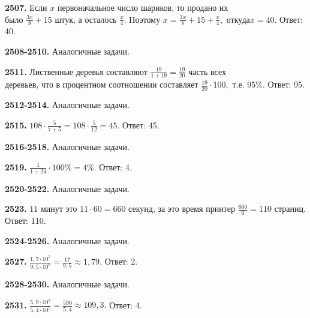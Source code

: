 \textbf{2507.} $\text{Если } x \text{ первоначальное число шариков, то продано их}$\newline$\text{было }\frac{3x}{8} + 15 \text{ штук, а осталось }\frac{x}{4}.\text{ Поэтому } x = \frac{3x}{8} + 15 + \frac{x}{4}, \text{ откуда}$\newline$ x = 40.$ \newline \null \hspace*{\fill} Ответ: 40.  

\textbf{2508-2510.} Аналогичные задачи.

\textbf{2511.} $\text{Лиственные деревья составляют } \frac{19}{1+19} = \frac{19}{20} \text{ часть всех}$\newline$\text{деревьев, что в процентном соотношении составляет } \frac{19}{20} \cdot 100, \text{ т.е. }$\newline$ 95\%$. \newline \null \hspace*{\fill} Ответ: 95. 

\textbf{2512-2514.} Аналогичные задачи.

\textbf{2515.} $108 \cdot \frac{5}{7+5} = 108 \cdot \frac{5}{12} = 45.$ \newline \null \hspace*{\fill} Ответ: 45. 

\textbf{2516-2518.} Аналогичные задачи.

\textbf{2519.} $\frac{1}{1+24} \cdot 100\% = 4\%.$ \null \hspace*{\fill} Ответ: 4. 

\textbf{2520-2522.} Аналогичные задачи.

\textbf{2523.} $11 \text{ минут это } 11 \cdot 60 = 660 \text{ секунд, за это время принтер}$\newline{} $\frac{660}{6} = 110 \text{ страниц}.$ \newline \null \hspace*{\fill} Ответ: 110. 

\textbf{2524-2526.} Аналогичные задачи.

\textbf{2527.} $\frac{1,7 \cdot 10^7}{9,5 \cdot 10^6} = \frac{17}{9,5} \approx 1,79.$ \newline \null \hspace*{\fill} Ответ: 2. 

\textbf{2528-2530.} Аналогичные задачи.

\textbf{2531.} $\frac{5,9 \cdot 10^7}{5,4 \cdot 10^5}=\frac{590}{5,4}\approx109,3.$ \newline \null \hspace*{\fill} Ответ: 4. 

